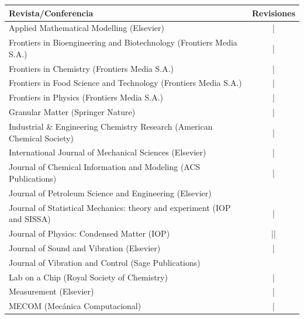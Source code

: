 \begin{center}
  \begin{tabular}{l c}
    \toprule
    \textbf{Revista/Conferencia}                                             & R\textbf{evisiones} \\
    \midrule
    Applied Mathematical Modelling (Elsevier)                                & |                   \\
    Frontiers in Bioengineering and Biotechnology (Frontiers Media S.A.)     & |                   \\
    Frontiers in Chemistry (Frontiers Media S.A.)                            & |                   \\
    Frontiers in Food Science and Technology (Frontiers Media S.A.)          & |                   \\
    Frontiers in Physics (Frontiers Media S.A.)                              & |                   \\
    Granular Matter (Springer Nature)                                        & |                   \\
    Industrial \& Engineering Chemistry Research (American Chemical Society) & |                   \\
    International Journal of Mechanical Sciences (Elsevier)                  & |                   \\
    Journal of Chemical Information and Modeling (ACS Publications)          & |                   \\
    Journal of Petroleum Science and Engineering (Elsevier)                  & \cancel{||||}       \\
    Journal of Statistical Mechanics: theory and experiment (IOP and SISSA)  & |                   \\
    Journal of Physics: Condensed Matter (IOP)                               & ||                  \\
    Journal of Sound and Vibration (Elsevier)                                & \cancel{||||} |     \\
    Journal of Vibration and Control (Sage Publications)                     & \cancel{||||}       \\
    Lab on a Chip (Royal Society of Chemistry)                               & |                   \\
    Measurement (Elsevier)                                                   & |                   \\
    MECOM (Mecánica Computacional)                                           & |                   \\

\end{tabular}
\end{center}

